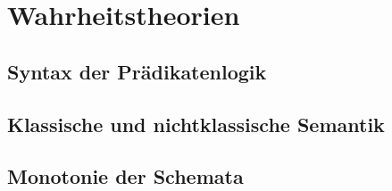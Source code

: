 \documentclass[a4paper,11pt,abstracton]{scrartcl}
\begin{document}
\section{Wahrheitstheorien}
\subsection{Syntax der Prädikatenlogik}
\subsection{Klassische und nichtklassische Semantik}
\subsection{Monotonie der Schemata}
\end{document}
